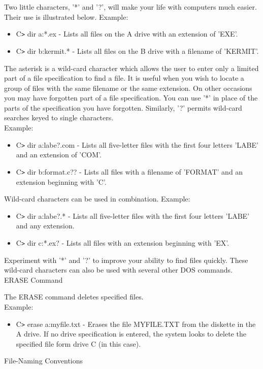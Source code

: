 \documentclass[11pt,a4paper,twoside]{article}
\begin{document}
Two little characters, '*' and '?', will make your life with computers much easier. Their use is illustrated below.
Example:
\begin{itemize}
    \item C\verb=>= dir a:*.ex - Lists all files on the A drive with an extension of 'EXE'.
\item C\verb=>= dir b:kermit.* - Lists all files on the B drive with a filename of 'KERMIT'.
\end{itemize}
The asterisk is a wild-card character which allows the user to enter only a limited part of a file specification to find a file. It is useful when you wish to locate a group of files with the same filename or the same extension. On other occasions you may have forgotten part of a file specification. You can use '*' in place of the parts of the specification you have forgotten. Similarly, '?' permits wild-card searches keyed to single characters.\\
Example:
\begin{itemize}
    \item C\verb=>= dir a:labe?.com - Lists all five-letter files with the first four letters 'LABE' and an extension of 'COM'.
\item C\verb=>= dir b:format.c?? - Lists all files with a filename of 'FORMAT' and an extension beginning with 'C'.
\end{itemize}
Wild-card characters can be used in combination.
Example:
\begin{itemize}
    \item C\verb=>= dir a:labe?.* - Lists all five-letter files with the first four letters 'LABE' and any extension.
\item C\verb=>= dir c:*.ex? - Lists all files with an extension beginning with 'EX'.
\end{itemize}	
Experiment with '*' and '?' to improve your ability to find files quickly. These wild-card characters can also be used with several other DOS commands.\\
ERASE Command\par
The ERASE command deletes specified files.\\
Example:
\begin{itemize}
    \item C\verb=>= erase a:myfile.txt - Erases the file MYFILE.TXT from the diskette in the A drive. If no drive specification is entered, the system looks to delete the specified file form drive C (in this case).
\end{itemize}	
File-Naming Conventions\par
\end{document}
